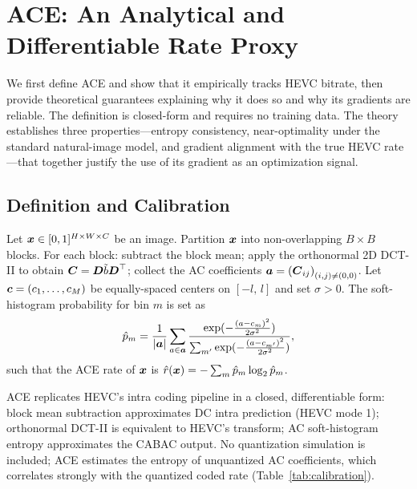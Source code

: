 \section{ACE: An Analytical and Differentiable Rate Proxy}
\label{sec:proxy}

We first define ACE and show that it empirically tracks HEVC bitrate, then provide theoretical guarantees explaining why it does so and why its gradients are reliable.
The definition is closed-form and requires no training data.
The theory establishes three properties---entropy consistency, near-optimality under the standard natural-image model, and gradient alignment with the true HEVC rate---that together justify the use of its gradient as an optimization signal.

\subsection{Definition and Calibration}
\label{sec:definition}

\begin{definition}[ACE]
\label{def:proxy}
Let $\boldsymbol{x} \in [0,1]^{H \times W \times C}$ be an image.
Partition $\boldsymbol{x}$ into non-overlapping $B \times B$ blocks.
For each block: subtract the block mean; apply the orthonormal 2D DCT-II to obtain $\boldsymbol{C} = \boldsymbol{D}\tilde{b}\boldsymbol{D}^\top$; collect the AC coefficients $\boldsymbol{a} = \left(\boldsymbol{C}_{ij}\right)_{(i,j)\neq(0,0)}$.
Let $\boldsymbol{c} = (c_1,\ldots,c_M)$ be equally-spaced centers on $[-l,\,l]$ and set $\sigma>0$.
The soft-histogram probability for bin $m$ is set as
\begin{equation*}
  \hat{p}_m = \frac{1}{|\boldsymbol{a}|}\sum_{a \in \boldsymbol{a}}
    \frac{\exp(-\tfrac{(a-c_m)^2}{2\sigma^2})}
         {\sum_{m'}\exp(-\tfrac{(a-c_{m'})^2}{2\sigma^2})},
\end{equation*}
such that the ACE rate of $\boldsymbol{x}$ is $\hat{r}(\boldsymbol{x}) = -\sum_{m} \hat{p}_m \log_2 \hat{p}_m$.
\end{definition}

ACE replicates HEVC's intra coding pipeline in a closed, differentiable form: block mean subtraction approximates DC intra prediction (HEVC mode 1); orthonormal DCT-II is equivalent to HEVC's transform; AC soft-histogram entropy approximates the CABAC output.
No quantization simulation is included; ACE estimates the entropy of unquantized AC coefficients, which correlates strongly with the quantized coded rate (Table~\ref{tab:calibration}).

